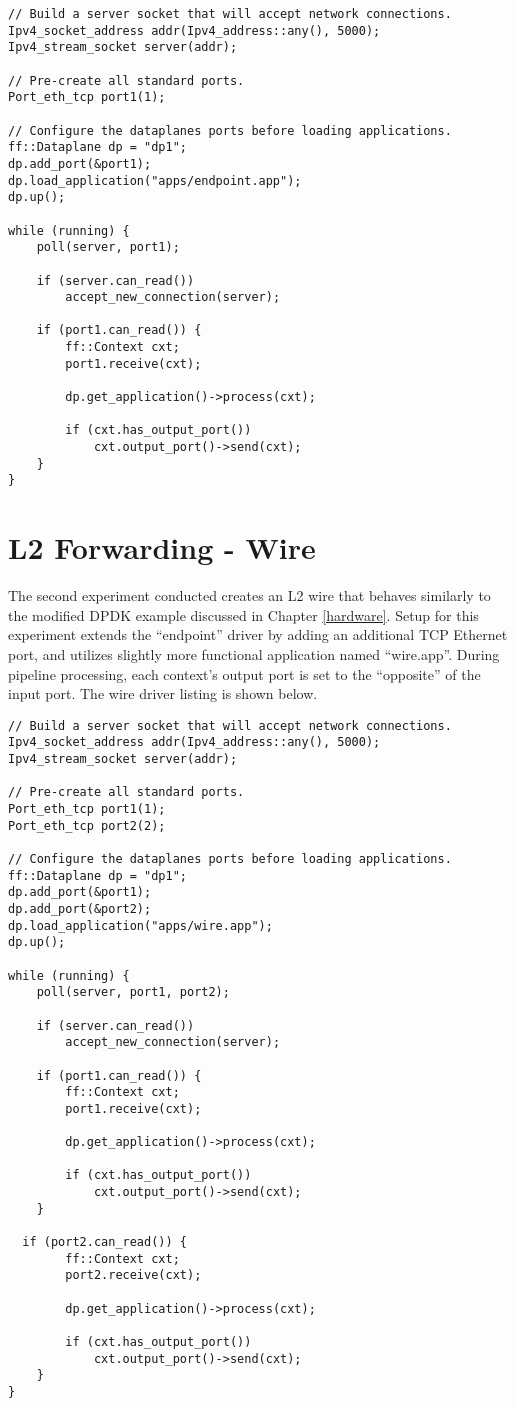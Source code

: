 \begin{lstlisting}
// Build a server socket that will accept network connections.
Ipv4_socket_address addr(Ipv4_address::any(), 5000);
Ipv4_stream_socket server(addr);

// Pre-create all standard ports.
Port_eth_tcp port1(1);

// Configure the dataplanes ports before loading applications.
ff::Dataplane dp = "dp1";
dp.add_port(&port1);
dp.load_application("apps/endpoint.app");
dp.up();

while (running) {
	poll(server, port1);

	if (server.can_read())
		accept_new_connection(server);

	if (port1.can_read()) {
		ff::Context cxt;
		port1.receive(cxt);

		dp.get_application()->process(cxt);

		if (cxt.has_output_port())
			cxt.output_port()->send(cxt);
	}
}
\end{lstlisting}


\section{L2 Forwarding - Wire}
\label{expr:wire}
The second experiment conducted creates an L2 wire that behaves similarly
to the modified DPDK example discussed in Chapter \ref{hardware}. Setup for
this experiment extends the ``endpoint'' driver by adding an additional TCP
Ethernet port, and utilizes slightly more functional application named
``wire.app''. During pipeline processing, each context's output port is set
to the ``opposite'' of the input port. The wire driver listing is shown below.

\begin{lstlisting}
// Build a server socket that will accept network connections.
Ipv4_socket_address addr(Ipv4_address::any(), 5000);
Ipv4_stream_socket server(addr);

// Pre-create all standard ports.
Port_eth_tcp port1(1);
Port_eth_tcp port2(2);

// Configure the dataplanes ports before loading applications.
ff::Dataplane dp = "dp1";
dp.add_port(&port1);
dp.add_port(&port2);
dp.load_application("apps/wire.app");
dp.up();

while (running) {
	poll(server, port1, port2);

	if (server.can_read())
		accept_new_connection(server);

	if (port1.can_read()) {
		ff::Context cxt;
		port1.receive(cxt);

		dp.get_application()->process(cxt);

		if (cxt.has_output_port())
			cxt.output_port()->send(cxt);
	}

  if (port2.can_read()) {
		ff::Context cxt;
		port2.receive(cxt);

		dp.get_application()->process(cxt);

		if (cxt.has_output_port())
			cxt.output_port()->send(cxt);
	}
}
\end{lstlisting}

